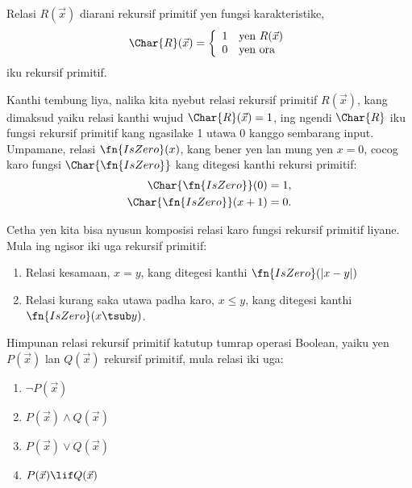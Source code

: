 \documentclass[../../../include/open-logic-section]{subfiles}
\begin{document}


\begin{defn}
Relasi $R(\vec x)$ diarani rekursif primitif yen fungsi
karakteristike,
\[
\Char{R}(\vec x) = \left\{
  \begin{array}{ll}
  1 & \mbox{yen $R(\vec x)$} \\
  0 & \mbox{yen ora}
  \end{array}
\right.
\]
iku rekursif primitif.
\end{defn}

Kanthi tembung liya, nalika kita nyebut relasi rekursif
primitif $R(\vec x)$, kang dimaksud yaiku relasi kanthi
wujud $\Char{R}(\vec
x) = 1$, ing ngendi $\Char{R}$ iku fungsi rekursif primitif
kang ngasilake 1 utawa 0 kanggo sembarang input. Umpamane,
relasi $\fn{IsZero}(x)$, kang bener yen lan mung yen $x = 0$,
cocog karo fungsi $\Char{\fn{IsZero}}$ kang ditegesi
kanthi rekursi primitif:
\begin{align*}
\Char{\fn{IsZero}}(0) & = 1,\\
\Char{\fn{IsZero}}(x+1) & = 0.
\end{align*}

Cetha yen kita bisa nyusun komposisi relasi karo fungsi
rekursif primitif liyane. Mula ing ngisor iki uga rekursif
primitif:
\begin{enumerate}
\item Relasi kesamaan, $x = y$, kang ditegesi kanthi
  $\fn{IsZero}(\left|x -
  y\right|)$
%
%
%
\item Relasi kurang saka utawa padha karo, $x \leq y$, kang
  ditegesi kanthi $\fn{IsZero}(x
  \tsub y)$.
\end{enumerate}


\begin{prop}
  Himpunan relasi rekursif primitif katutup tumrap operasi
  Boolean, yaiku yen $P(\vec x)$ lan $Q(\vec x)$ rekursif
  primitif, mula relasi iki uga:
  \begin{enumerate}
  \item $\lnot P(\vec x)$
  \item $P(\vec x) \land Q(\vec x)$
  \item $P(\vec x) \lor Q(\vec x)$
  \item $P(\vec x) \lif Q(\vec x)$
  \end{enumerate}
\end{prop}
\end{document}

